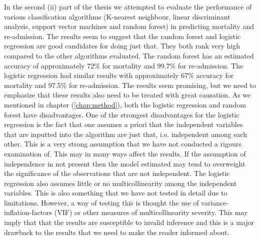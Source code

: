 \documentclass[../thesis.tex]{subfiles}
\begin{document}
\indent In the second (ii) part of the thesis we attempted to evaluate the performance of various classification algorithms (K-nearest neighbour, linear discriminant analysis, support vector machines and random forest) in predicting mortality and re-admission. The results seem to suggest that the random forest and logistic regression are good candidates for doing just that. They both rank very high compared to the other algorithms evaluated. The random forest has an estimated accuracy of approximately 72\% for mortality and 99.7\% for re-admission. The logistic regression had similar results with approximately 67\% accuracy for mortality and 97.5\% for re-admission. The results seem promising, but we need to emphasize that these results also need to be treated with great causation. As we mentioned in chapter (\ref{chap:method}), both the logistic regression and random forest have disadvantages. One of the strongest disadvantages for the logistic regression is the fact that one assumes a priori that the independent variables that are inputted into the algorithm are just that, i.e. independent among each other. This is a very strong assumption that we have not conducted a rigours examination of. This may in many ways affect the results. If the assumption of independence in not present then the model estimated may tend to overweight the significance of the observations that are not independent. The logistic regression also assumes little or no multicollinearity among the independent variables. This is also something that we have not tested in detail due to limitations. However, a way of testing this is thought the use of variance-inflation-factors (VIF) or other measures of multicollinearity severity. This may imply that that the results are susceptible to invalid inference and this is a major drawback to the results that we need to make the reader informed about.
\end{document}

